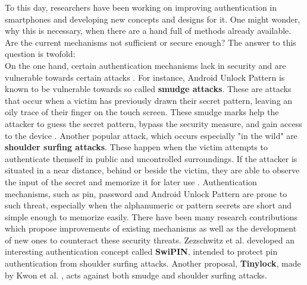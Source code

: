 To this day, researchers have been working on improving authentication in smartphones and developing new concepts and designs for it. One might wonder, why this is necessary, when there are a hand full of methods already available. Are the current mechanisms not sufficient or secure enough? The answer to this question is twofold:\\

On the one hand, certain authentication mechanisms lack in security and are vulnerable towards certain attacks \cite{Schloeglhofer}. For instance, Android Unlock Pattern is known to be vulnerable towards so called \textbf{smudge attacks}. These are attacks that occur when a victim has previously drawn their secret pattern, leaving an oily trace of their finger on the touch screen. These smudge marks help the attacker to guess the secret pattern, bypass the security measure, and gain access to the device \cite{ediss20251}. Another popular attack, which occurs especially "in the wild" are \textbf{shoulder surfing attacks}. These happen when the victim attempts to authenticate themself in public and uncontrolled surroundings. If the attacker is situated in a near distance, behind or beside the victim, they are able to observe the input of the secret and memorize it for later use \cite{ediss20251}. Authentication mechanisms, such as pin, password and Android Unlock Pattern are prone to such threat, especially when the alphanumeric or pattern secrets are short and simple enough to memorize easily. There have been many research contributions which propose improvements of existing mechanisms as well as the development of new ones to counteract these security threats. Zezschwitz et al. \cite{vonZezschwitz:2015:SFS:2702123.2702212} developed an interesting authentication concept called \textbf{SwiPIN}, intended to protect pin authentication from shoulder surfing attacks. Another proposal, \textbf{Tinylock}, made by Kwon et al. \cite{kwon}, acts against both smudge and shoulder surfing attacks. \\



